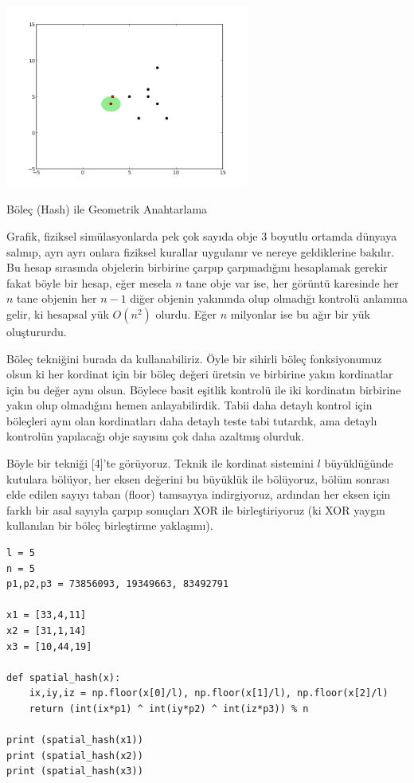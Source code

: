 \documentclass[12pt,fleqn]{article}\usepackage{../../common}
\begin{document}
\includegraphics[height=6cm]{knn9.png}

Böleç (Hash) ile Geometrik Anahtarlama

Grafik, fiziksel simülasyonlarda pek çok sayıda obje 3 boyutlu ortamda dünyaya
salınıp, ayrı ayrı onlara fiziksel kurallar uygulanır ve nereye geldiklerine
bakılır. Bu hesap sırasında objelerin birbirine çarpıp çarpmadığını hesaplamak
gerekir fakat böyle bir hesap, eğer mesela $n$ tane obje var ise, her görüntü
karesinde her $n$ tane objenin her $n-1$ diğer objenin yakınında olup olmadığı
kontrolü anlamına gelir, ki hesapsal yük $O(n^2)$ olurdu. Eğer $n$ milyonlar ise
bu ağır bir yük oluştururdu.

Böleç tekniğini burada da kullanabiliriz. Öyle bir sihirli böleç fonksiyonumuz
olsun ki her kordinat için bir böleç değeri üretsin ve birbirine yakın
kordinatlar için bu değer aynı olsun. Böylece basit eşitlik kontrolü ile iki
kordinatın birbirine yakın olup olmadığını hemen anlayabilirdik. Tabii daha
detaylı kontrol için böleçleri aynı olan kordinatları daha detaylı teste tabi
tutardık, ama detaylı kontrolün yapılacağı obje sayısını çok daha azaltmış
olurduk.

Böyle bir tekniği [4]'te görüyoruz. Teknik ile kordinat sistemini $l$
büyüklüğünde kutulara bölüyor, her eksen değerini bu büyüklük ile bölüyoruz,
bölüm sonrası elde edilen sayıyı taban (floor) tamsayıya indirgiyoruz, ardından
her eksen için farklı bir asal sayıyla çarpıp sonuçları XOR ile birleştiriyoruz
(ki XOR yaygın kullanılan bir böleç birleştirme yaklaşımı).

\begin{verbatim}
l = 5
n = 5
p1,p2,p3 = 73856093, 19349663, 83492791

x1 = [33,4,11]
x2 = [31,1,14]
x3 = [10,44,19]

def spatial_hash(x):
    ix,iy,iz = np.floor(x[0]/l), np.floor(x[1]/l), np.floor(x[2]/l)
    return (int(ix*p1) ^ int(iy*p2) ^ int(iz*p3)) % n

print (spatial_hash(x1))
print (spatial_hash(x2))
print (spatial_hash(x3))
\end{verbatim}
\end{document}
